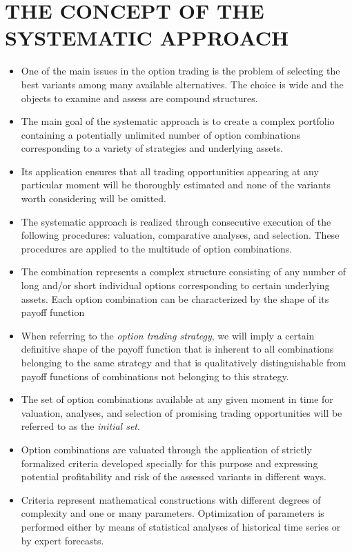     \section*{THE CONCEPT OF THE SYSTEMATIC APPROACH}
        \begin{itemize}
            \item One of the main issues in the option trading is the problem of selecting the best variants among many available alternatives. The choice is wide and the objects to examine and assess are compound structures.
            \item The main goal of the systematic approach is to create a complex portfolio containing a potentially unlimited number of option combinations corresponding to a variety of strategies and underlying assets.
            \item Its application ensures that all trading opportunities appearing at any particular moment will be thoroughly estimated and none of the variants worth considering will be omitted.
            \item The systematic approach is realized through consecutive execution of the following procedures: valuation, comparative analyses, and selection. These procedures are applied to the multitude of option combinations.
            \item The combination represents a complex structure consisting of any number of long and/or short individual options corresponding to certain underlying assets. Each option combination can be characterized by the shape of its payoff function
            \item When referring to the \textit{option trading strategy}, we will imply a certain definitive shape of the payoff function that is inherent to all combinations belonging to the same strategy and that is qualitatively distinguishable from payoff functions of combinations not belonging to this strategy.
            \item The set of option combinations available at any given moment in time for valuation, analyses, and selection of promising trading opportunities will be referred to as the \textit{initial set}.
            \item Option combinations are valuated through the application of strictly formalized criteria developed specially for this purpose and expressing potential profitability and risk of the assessed variants in different ways.
            \item Criteria represent mathematical constructions with different degrees of complexity and one or many parameters. Optimization of parameters is performed either by means of statistical analyses of historical time series or by expert forecasts.

\end{itemize}
